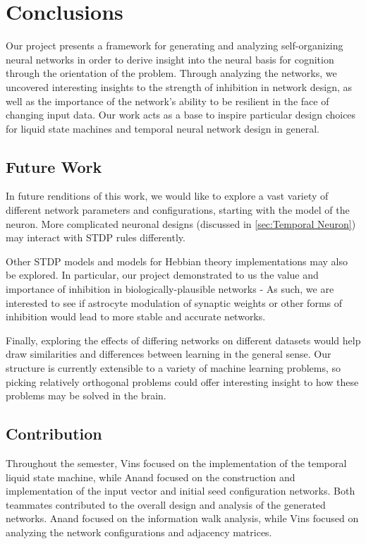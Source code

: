 \section{Conclusions} \label{sec:Conclusions}

Our project presents a framework for generating and analyzing self-organizing
neural networks in order to derive insight into the neural basis for cognition
through the orientation of the problem. Through analyzing the networks, we
uncovered interesting insights to the strength of inhibition in network design,
as well as the importance of the network's ability to be resilient in the face
of changing input data. Our work acts as a base to inspire particular design
choices for liquid state machines and temporal neural network design in general.

\subsection{Future Work} \label{sec:Future Work}

In future renditions of this work, we would like to explore a vast variety of
different network parameters and configurations, starting with the model of the
neuron. More complicated neuronal designs (discussed in
\ref{sec:Temporal Neuron}) may interact with STDP rules differently.

Other STDP models and models for Hebbian theory implementations may also be
explored. In particular, our project demonstrated to us the value and importance
of inhibition in biologically-plausible networks - As such, we are interested to
see if astrocyte modulation of synaptic weights or other forms of inhibition
would lead to more stable and accurate networks.

Finally, exploring the effects of differing networks on different datasets would
help draw similarities and differences between learning in the general sense.
Our structure is currently extensible to a variety of machine learning problems,
so picking relatively orthogonal problems could offer interesting insight to how
these problems may be solved in the brain.

\subsection{Contribution}

Throughout the semester, Vins focused on the implementation of the temporal
liquid state machine, while Anand focused on the construction and implementation
of the input vector and initial seed configuration networks. Both teammates
contributed to the overall design and analysis of the generated networks. Anand
focused on the information walk analysis, while Vins focused on analyzing the
network configurations and adjacency matrices.